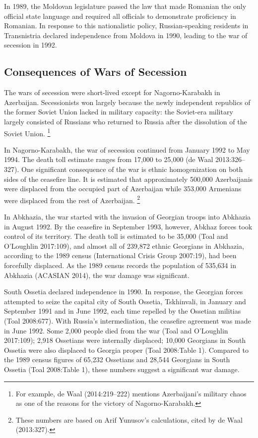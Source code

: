 \documentclass[12pt,a4paper]{article}%
\begin{document}
In 1989, the Moldovan legislature passed the law that made Romanian the only official state language and required all officials to demonstrate proficiency in Romanian. 
In response to this nationalistic policy, Russian-speaking residents in Transnistria declared independence from Moldova in 1990, leading to the war of secession in 1992.%
\subsection{Consequences of Wars of Secession}
The wars of secession were short-lived except for Nagorno-Karabakh in Azerbaijan. 
Secessionists won largely because the newly independent republics of the former Soviet Union lacked in military capacity: the Soviet-era military largely consisted of Russians who returned to Russia after the dissolution of the Soviet Union.%
\footnote{
	For example, de Waal (2014:219--222) mentions Azerbaijani's military chaos as one of the reasons for the victory of Nagorno-Karabakh.
}

In Nagorno-Karabakh, the war of secession continued from January 1992 to May 1994. The death toll estimate ranges from 17,000 to 25,000 (de Waal 2013:326--327). One significant consequence of the war is ethnic homogenization on both sides of the ceasefire line. 
It is estimated that approximately 500,000 Azerbaijanis were displaced from the occupied part of Azerbaijan while 353,000 Armenians were displaced from the rest of Azerbaijan.%
\footnote{
	These numbers are based on Arif Yunusov's calculations, cited by de Waal (2013:327).
}

In Abkhazia, the war started with the invasion of Georgian troops into Abkhazia in August 1992. 
By the ceasefire in September 1993, however, Abkhaz forces took control of its territory.
The death toll is estimated to be 35,000 (Toal and O'Loughlin 2017:109), and almost all of 239,872 ethnic Georgians in Abkhazia, according to the 1989 census (International Crisis Group 2007:19), had been forcefully displaced. 
As the 1989 census records the population of 535,634 in Abkhazia (ACASIAN 2014), the war damage was significant.

South Ossetia declared independence in 1990. 
In response, the Georgian forces attempted to seize the capital city of South Ossetia, Tskhinvali, in January and September 1991 and in June 1992, each time repelled by the Ossetian militias (Toal 2008:677).
With Russia's intermediation, the ceasefire agreement was made in June 1992.
Some 2,000 people died from the war (Toal and O'Loughlin 2017:109); 2,918 Ossetians were internally displaced; 10,000 Georgians in South Ossetia were also displaced to Georgia proper (Toal 2008:Table 1). 
Compared to the 1989 census figures of 65,232 Ossetians and 28,544 Georgians in South Ossetia (Toal 2008:Table 1), these numbers suggest a significant war damage.
\end{document}
